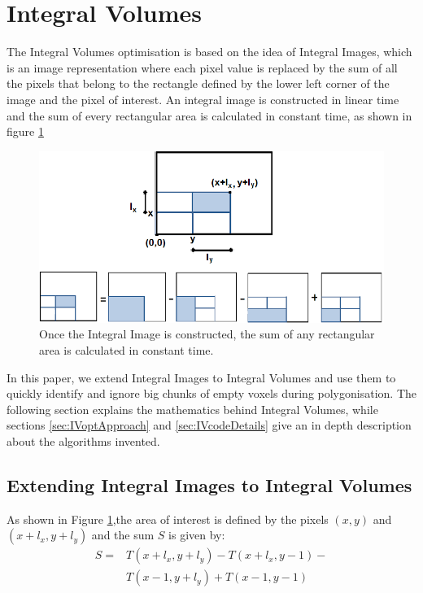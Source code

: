 \documentclass{subfiles}
\begin{document}
\section{Integral Volumes}\label{sec:IVopt}
The Integral Volumes optimisation is based on the idea of Integral Images, which is an image representation where each pixel value is replaced by the sum of all the pixels that belong to the rectangle defined by the lower left corner of the image and the pixel of interest.  An integral image is constructed in linear time and the sum of every rectangular area is calculated in constant time, as shown in figure \ref{fig:IntegralImages} \cite{Crow1984}


\begin{figure}[!htbp]
	\centering
	\includegraphics[width=5.5in]{img/IntegralImages}
	\caption[Integral Image]{Once the Integral Image is constructed, the sum of any rectangular area is calculated in constant time.}
	\label{fig:IntegralImages}
\end{figure}


In this paper, we extend Integral Images to Integral Volumes and use them to quickly identify and ignore big chunks of empty voxels during polygonisation. The following section explains the mathematics behind Integral Volumes, while sections \ref{sec:IVoptApproach}  and \ref{sec:IVcodeDetails} give an in depth description about the algorithms invented. 

\subsection{Extending Integral Images to Integral Volumes}\label{sec:extendingIV}

As shown in Figure \ref{fig:IntegralImages},the area of interest is defined by the pixels $(x, y)$ and $(x+l_x, y+l_y)$ and the sum $S$ is given by: 
\begin{equation}
\begin{split}
S = & T(x+l_x,y+l_y) - 
T(x+l_x,y-1)- \\
&  T(x-1,y+l_y) +
T(x-1,y-1)
\end{split}
\label{eq:IntegralImage}
\end{equation}
\end{document}
